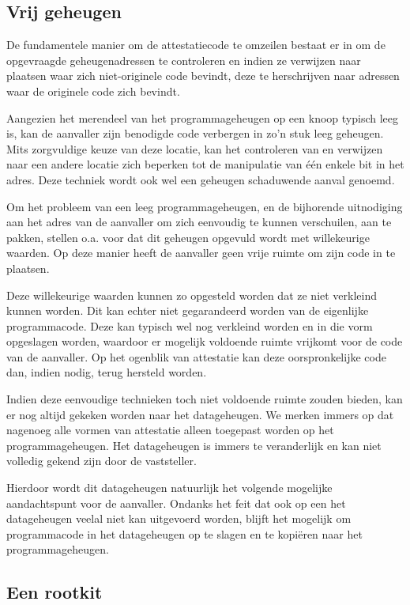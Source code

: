 \subsection{Vrij geheugen}

De fundamentele manier om de attestatiecode te omzeilen bestaat er in om de
opgevraagde geheugenadressen te controleren en indien ze verwijzen naar
plaatsen waar zich niet-originele code bevindt, deze te herschrijven naar
adressen waar de originele code zich bevindt.

Aangezien het merendeel van het programmageheugen op een knoop typisch leeg
is, kan de aanvaller zijn benodigde code verbergen in zo'n stuk leeg geheugen.
Mits zorgvuldige keuze van deze locatie, kan het controleren van en verwijzen
naar een andere locatie zich beperken tot de manipulatie van \'e\'en enkele bit
in het adres. Deze techniek wordt ook wel een geheugen schaduwende aanval
genoemd.

Om het probleem van een leeg programmageheugen, en de bijhorende uitnodiging
aan het adres van de aanvaller om zich eenvoudig te kunnen verschuilen, aan te
pakken, stellen o.a. \citep{yang2007distributed,seshadri2008sake} voor dat dit
geheugen opgevuld wordt met willekeurige waarden. Op deze manier heeft de
aanvaller geen vrije ruimte om zijn code in te plaatsen.

Deze willekeurige waarden kunnen zo opgesteld worden dat ze niet verkleind
kunnen worden. Dit kan echter niet gegarandeerd worden van de eigenlijke
programmacode. Deze kan typisch wel nog verkleind worden en in die vorm
opgeslagen worden, waardoor er mogelijk voldoende ruimte vrijkomt voor de code
van de aanvaller. Op het ogenblik van attestatie kan deze oorspronkelijke code
dan, indien nodig, terug hersteld worden.

Indien deze eenvoudige technieken toch niet voldoende ruimte zouden bieden, kan
er nog altijd gekeken worden naar het datageheugen. We merken immers op dat
nagenoeg alle vormen van attestatie alleen toegepast worden op het
programmageheugen. Het datageheugen is immers te veranderlijk en kan niet
volledig gekend zijn door de vaststeller.

Hierdoor wordt dit datageheugen natuurlijk het volgende mogelijke aandachtspunt
voor de aanvaller. Ondanks het feit dat ook op een \mcu het datageheugen veelal
niet kan uitgevoerd worden, blijft het mogelijk om programmacode in het
datageheugen op te slagen en te kopi\"eren naar het programmageheugen.

\subsection{Een rootkit}

